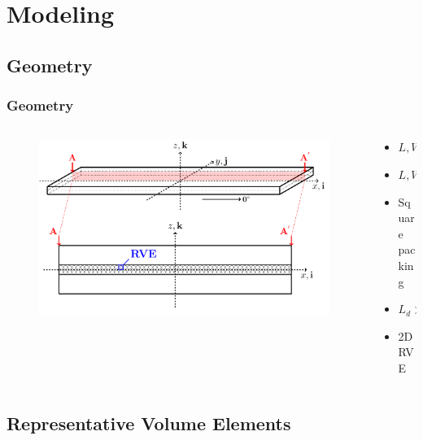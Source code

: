 \documentclass[first,firstsupp,lastsupp,last,hyperref,table]{ETHclass}
\begin{document}
\section{Modeling}

\subsection{Geometry}

\begin{frame}
\frametitle{\vspace{0.2cm}\small Geometry}
\vspace{-1cm}
\centering
\begin{columns}[c]
\begin{column}{0.85\textwidth}
\begin{figure}
\centering
\includegraphics[width=\columnwidth]{laminate-section.pdf}
\end{figure}
\end{column}
\begin{column}{0.15\textwidth}
\scriptsize
\begin{itemize}[label=]
\item $L, W >> t$
\item $L, W \rightarrow \infty$
\item Square packing
\item$L_{d} >> \Delta\theta_{d}$
\item 2D RVE
\end{itemize}
\end{column}
\end{columns}
\end{frame}

\subsection{Representative Volume Elements}
\end{document}
